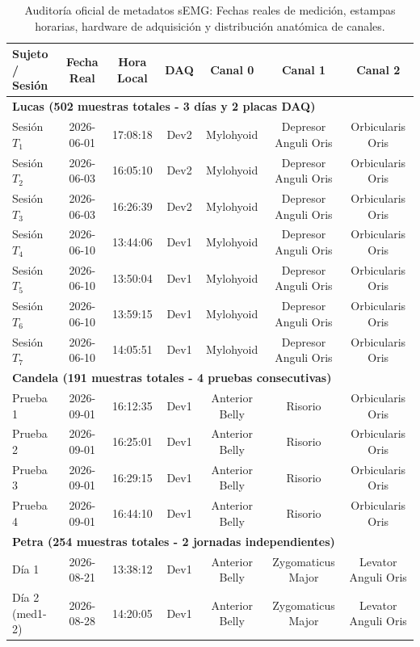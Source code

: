 \documentclass[11pt,a4paper,openany]{book}
\theoremstyle{definition}
\begin{document}
\begin{table}[H]
\centering
\small
\begin{tabular}{lcccccc}
\toprule
\textbf{Sujeto / Sesión} & \textbf{Fecha Real} & \textbf{Hora Local} & \textbf{DAQ} & \textbf{Canal 0} & \textbf{Canal 1} & \textbf{Canal 2} \\
\midrule
\multicolumn{7}{l}{\textbf{Lucas (502 muestras totales - 3 días y 2 placas DAQ)}} \\
\midrule
Sesión $T_1$ & 2026-06-01 & 17:08:18 & Dev2 & Mylohyoid & Depresor Anguli Oris & Orbicularis Oris \\
Sesión $T_2$ & 2026-06-03 & 16:05:10 & Dev2 & Mylohyoid & Depresor Anguli Oris & Orbicularis Oris \\
Sesión $T_3$ & 2026-06-03 & 16:26:39 & Dev2 & Mylohyoid & Depresor Anguli Oris & Orbicularis Oris \\
Sesión $T_4$ & 2026-06-10 & 13:44:06 & Dev1 & Mylohyoid & Depresor Anguli Oris & Orbicularis Oris \\
Sesión $T_5$ & 2026-06-10 & 13:50:04 & Dev1 & Mylohyoid & Depresor Anguli Oris & Orbicularis Oris \\
Sesión $T_6$ & 2026-06-10 & 13:59:15 & Dev1 & Mylohyoid & Depresor Anguli Oris & Orbicularis Oris \\
Sesión $T_7$ & 2026-06-10 & 14:05:51 & Dev1 & Mylohyoid & Depresor Anguli Oris & Orbicularis Oris \\
\midrule
\multicolumn{7}{l}{\textbf{Candela (191 muestras totales - 4 pruebas consecutivas)}} \\
\midrule
Prueba 1 & 2026-09-01 & 16:12:35 & Dev1 & Anterior Belly & Risorio & Orbicularis Oris \\
Prueba 2 & 2026-09-01 & 16:25:01 & Dev1 & Anterior Belly & Risorio & Orbicularis Oris \\
Prueba 3 & 2026-09-01 & 16:29:15 & Dev1 & Anterior Belly & Risorio & Orbicularis Oris \\
Prueba 4 & 2026-09-01 & 16:44:10 & Dev1 & Anterior Belly & Risorio & Orbicularis Oris \\
\midrule
\multicolumn{7}{l}{\textbf{Petra (254 muestras totales - 2 jornadas independientes)}} \\
\midrule
Día 1 & 2026-08-21 & 13:38:12 & Dev1 & Anterior Belly & Zygomaticus Major & Levator Anguli Oris \\
Día 2 (med1-2) & 2026-08-28 & 14:20:05 & Dev1 & Anterior Belly & Zygomaticus Major & Levator Anguli Oris \\
\bottomrule
\end{tabular}
\caption{Auditoría oficial de metadatos sEMG: Fechas reales de medición, estampas horarias, hardware de adquisición y distribución anatómica de canales.}
\label{tab:auditoria_hardware_longitudinal}
\end{table}
\end{document}
